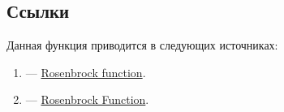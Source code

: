 \subsection {Ссылки}

Данная функция приводится в следующих источниках:

\begin{enumerate}
\item \cite{web:wiki_Rosenbrock_function} ---  \href{http://en.wikipedia.org/wiki/Rosenbrock_function}{Rosenbrock function}.
\item \cite{web:Rosenbrock_Function} ---  \href{http://www-optima.amp.i.kyoto-u.ac.jp/member/student/hedar/Hedar_files/TestGO_files/Page2537.htm}{Rosenbrock Function}.
\end{enumerate}

\clearpage